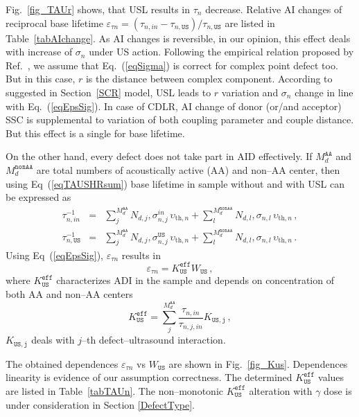 \documentclass[aip,jap, amsmath,amssymb,reprint]{revtex4-1}
\begin{document}
Fig.~\ref{fig_TAUr} shows, that USL results in $\tau_n$ decrease.
Relative AI changes of reciprocal base lifetime $\varepsilon_{\tau n}=(\tau_{n,in}-\tau_{n,\mathtt{US}})/\tau_{n,\mathtt{US}}$
are listed in Table~\ref{tabAIchange}.
As AI changes is reversible, in our opinion, this effect deals with increase of $\sigma_n$ under US action.
Following the empirical relation  proposed by Ref.~, we assume that Eq.~(\ref{eqSigma})
is correct for complex point defect too.
But in this case, $r$ is the distance between complex component.
According to suggested in Section~\ref{SCR} model, USL leads to $r$ variation
and $\sigma_n$ change in line with Eq.~(\ref{eqEpsSig}).
In case of CDLR, AI change of donor (or/and acceptor) SSC is supplemental to variation of
both coupling parameter and couple distance.
But this effect is a single for base lifetime.

On the other hand, every defect does not take part in AID effectively.
If  $M_d^\mathtt{AA}$ and $M_d^\mathtt{nonAA}$ are total numbers of acoustically active (AA) and non--AA center,
then using Eq~(\ref{eqTAUSHRsum}) base lifetime in sample without and with USL can be expressed as
\begin{eqnarray}
\tau_{n,in}^{-1}&=&\sum_j^{M_d^\mathtt{AA}}N_{d,j},\sigma_{n,j}^{in}\,\upsilon_{\mathrm{th},n}+
\sum_l^{M_d^\mathtt{nonAA}}N_{d,l},\sigma_{n,l}\,\upsilon_{\mathrm{th},n}\,,\nonumber\\
\tau_{n,\mathtt{US}}^{-1}&=&\sum_j^{M_d^\mathtt{AA}}N_{d,j},\sigma_{n,j}^\mathtt{US}\,\upsilon_{\mathrm{th},n}+
\sum_l^{M_d^\mathtt{nonAA}}N_{d,l},\sigma_{n,l}\,\upsilon_{\mathrm{th},n}\,.\nonumber
\end{eqnarray}
Using Eq~(\ref{eqEpsSig}), $\varepsilon_{\tau n}$  results in
\begin{equation}
\label{eqEpsTAU}
\varepsilon_{\tau n}=K_\mathtt{US}^\mathtt{eff}W_\mathtt{US}\,,
\end{equation}
where $K_\mathtt{US}^\mathtt{eff}$ characterizes ADI in the sample
and depends on concentration of both AA and non--AA centers
\begin{equation}
\label{eqKeff}
K_\mathtt{US}^\mathtt{eff}=\sum_j^{M_d^\mathtt{AA}}\frac{\tau_{n,in}}{\tau_{n,j,in}}K_\mathtt{US,j}\,,
\end{equation}
$K_\mathtt{US,j}$ deals with $j$--th defect--ultrasound interaction.

The obtained dependences $\varepsilon_{\tau n}$ vs $W_\mathtt{US}$ are shown in Fig.~\ref{fig_Kus}.
Dependences linearity is evidence of our assumption correctness.
The determined $K_\mathtt{US}^\mathtt{eff}$ values are listed in Table~\ref{tabTAUn}.
The non--monotonic $K_\mathtt{US}^\mathtt{eff}$ alteration with $\gamma$ dose
is under consideration in Section \ref{DefectType}.
\end{document}
